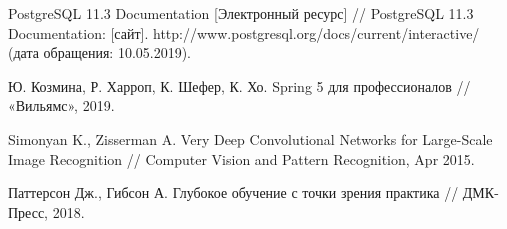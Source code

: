 \begin{thebibliography}{00}
    PostgreSQL 11.3 Documentation
    [Электронный ресурс] // 
    PostgreSQL 11.3 Documentation: [сайт]. 
    http://www.postgresql.org/docs/current/interactive/
    (дата обращения: 10.05.2019).

    Ю. Козмина, Р. Харроп, К. Шефер, К. Хо. 
    Spring 5 для профессионалов //
    «Вильямс», 
    2019.

    Simonyan K., Zisserman A. 
    Very Deep Convolutional Networks for Large-Scale Image Recognition // 
    Computer Vision and Pattern Recognition, 
    Apr 2015.

    Паттерсон Дж., Гибсон А. 
    Глубокое обучение с точки зрения практика //
    ДМК-Пресс, 
    2018.

\end{thebibliography}
\endgroup

\clearpage